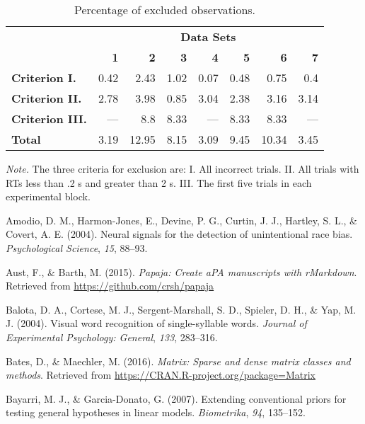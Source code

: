 \documentclass[american,man]{apa6}
\begin{document}
\begin{table}[tbp]
\begin{center}
\begin{threeparttable}
\caption{Percentage of excluded observations.}
\begin{tabular}{lrrrrrrr}
\toprule
 & \multicolumn{7}{c}{\bf{Data Sets}} \\
\cmidrule(r){2-8}
 & \bf{1} & \bf{2} & \bf{3} & \bf{4} & \bf{5} & \bf{6} & \bf{7}\\
\bf{Criterion I.} & 0.42 & 2.43 & 1.02 & 0.07 & 0.48 & 0.75 & 0.4\\
\bf{Criterion II.} & 2.78 & 3.98 & 0.85 & 3.04 & 2.38 & 3.16 & 3.14\\
\bf{Criterion III.} & --- & 8.8 & 8.33 & --- & 8.33 & 8.33 & ---\\
\bf{Total} & 3.19 & 12.95 & 8.15 & 3.09 & 9.45 & 10.34 & 3.45\\
\bottomrule
\end{tabular}
\begin{tablenotes}[para]
\textit{Note.} The three criteria for exclusion are: I. All incorrect trials. II. All trials with RTs less than .2 s and greater than 2 s. III. The first five trials in each experimental block.
\end{tablenotes}
\end{threeparttable}
\end{center}
\end{table}

Amodio, D. M., Harmon-Jones, E., Devine, P. G., Curtin, J. J., Hartley,
S. L., \& Covert, A. E. (2004). Neural signals for the detection of
unintentional race bias. \emph{Psychological Science}, \emph{15},
88--93.

Aust, F., \& Barth, M. (2015). \emph{Papaja: Create aPA manuscripts with
rMarkdown}. Retrieved from \url{https://github.com/crsh/papaja}

Balota, D. A., Cortese, M. J., Sergent-Marshall, S. D., Spieler, D. H.,
\& Yap, M. J. (2004). Visual word recognition of single-syllable words.
\emph{Journal of Experimental Psychology: General}, \emph{133},
283--316.

Bates, D., \& Maechler, M. (2016). \emph{Matrix: Sparse and dense matrix
classes and methods}. Retrieved from
\url{https://CRAN.R-project.org/package=Matrix}

Bayarri, M. J., \& Garcia-Donato, G. (2007). Extending conventional
priors for testing general hypotheses in linear models.
\emph{Biometrika}, \emph{94}, 135--152.
\end{document}
